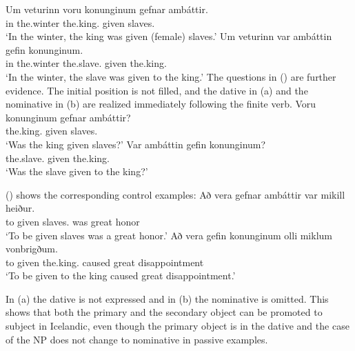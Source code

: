 \eal
\ex
\gll Um veturinn voru konunginum gefnar ambáttir.\\
     in the.winter \AUX{} the.king.\DAT{} given slaves.\NOM\\\icelandic
\glt `In the winter, the king was given (female) slaves.'
\ex
\gll Um veturinn var ambáttin gefin konunginum.\\
     in the.winter \AUX{} the.slave.\NOM{} given the.king.\NOM\\
\glt `In the winter, the slave was given to the king.'
\zl
The questions in () are further evidence. The initial position is not filled, and the dative
in (a) and the nominative in (b) are realized immediately following the finite verb.
\eal
\ex\label{ex-were-the-king-given-the-slaves}
\gll Voru konunginum gefnar ambáttir?\\
     \AUX{} the.king.\DAT{} given slaves.\NOM{}\\\icelandic
\glt `Was the king given slaves?'
\ex\label{ex-were-the-slaves-given-the-king}
\gll Var ambáttin gefin konunginum?\\
     \AUX{} the.slave.\NOM{} given the.king.\DAT\\
\glt `Was the slave given to the king?'
\zl

() shows the corresponding control examples:
\eal
\ex
\gll Að vera gefnar ambáttir var mikill heiður.\\
     to \AUX{} given slaves.\NOM{} was great honor\\\icelandic
\glt `To be given slaves was a great honor.'
\ex
\gll Að vera gefin konunginum olli miklum vonbrigðum.\\
     to \AUX{} given the.king.\DAT{} caused great disappointment\\
\glt `To be given to the king caused great disappointment.'

\zl
In (a) the dative is not expressed and in (b) the nominative is omitted. This shows
that both the primary and the secondary object can be promoted to subject in Icelandic, even though
the primary object is in the dative and the case of the NP does not change to nominative in passive examples.







